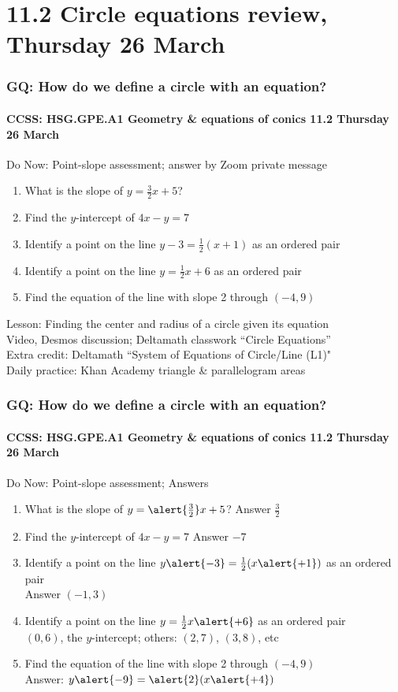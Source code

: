 \documentclass{beamer}
\begin{document}
\section{11.2 Circle equations review, Thursday 26 March} 
\frame
{
  \frametitle{GQ: How do we define a circle with an equation?}
  \framesubtitle{CCSS: HSG.GPE.A1 Geometry \& equations of conics \hfill \alert{11.2 Thursday 26 March}}

  \begin{block}{Do Now: Point-slope assessment; answer by Zoom private message}
    \begin{enumerate}
      \item What is the slope of $y=\frac{3}{2}x+5$?
      \item Find the $y$-intercept of $4x-y=7$
      \item Identify a point on the line $y-3=\frac{1}{2}(x+1)$ as an ordered pair
      \item Identify a point on the line $y=\frac{1}{2}x+6$ as an ordered pair
      \item Find the equation of the line with slope 2 through $(-4,9)$
    \end{enumerate}

    \end{block}
    Lesson: Finding the center and radius of a circle given its equation \\
    Video, Desmos discussion; Deltamath classwork ``Circle Equations''  \\
    Extra credit: Deltamath ``System of Equations of Circle/Line (L1)" \\[0.25cm]
    Daily practice: Khan Academy triangle \& parallelogram areas
}

\frame
{
  \frametitle{GQ: How do we define a circle with an equation?}
  \framesubtitle{CCSS: HSG.GPE.A1 Geometry \& equations of conics \hfill \alert{11.2 Thursday 26 March}}

  \begin{block}{Do Now: Point-slope assessment; \alert{Answers}}
    \begin{enumerate}
      \item What is the slope of $y=\alert{\frac{3}{2}}x+5$? \alert{Answer $\frac{3}{2}$}
      \item Find the $y$-intercept of $4x-y=7$ \alert{Answer $-7$}
      \item Identify a point on the line $y \alert{-3}=\frac{1}{2}(x \alert{+1})$ as an ordered pair \\
      \hspace{1cm} \alert{Answer $(-1,3)$}
      \item Identify a point on the line $y=\frac{1}{2}x \alert{+6}$ as an ordered pair \\
      \hspace{1cm} \alert{$(0,6)$, the $y$-intercept; others: $(2,7)$, $(3,8)$, etc}
      \item Find the equation of the line with slope 2 through $(-4,9)$ \\
      \hspace{1cm} \alert{Answer:} $y \alert{-9}=\alert{2}(x \alert{+4})$
    \end{enumerate}
    \end{block}
  
}
\end{document}
